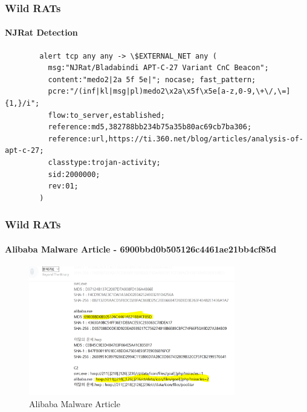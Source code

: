 \documentclass[aspectratio=169]{beamer}
\begin{document}
\begin{frame}[fragile]{}
  \frametitle{Wild RATs}
  \framesubtitle{NJRat Detection}
  \begin{center}
    \begin{tcolorbox}[title=njrat.rules,colback=black]
    \begin{minipage}{0.5\textwidth}
      \begin{verbatim}
        alert tcp any any -> \$EXTERNAL_NET any (
          msg:"NJRat/Bladabindi APT-C-27 Variant CnC Beacon";
          content:"medo2|2a 5f 5e|"; nocase; fast_pattern;
          pcre:"/(inf|kl|msg|pl)medo2\x2a\x5f\x5e[a-z,0-9,\+\/,\=]{1,}/i";
          flow:to_server,established;
          reference:md5,382788bb234b75a35b80ac69cb7ba306;
          reference:url,https://ti.360.net/blog/articles/analysis-of-apt-c-27;
          classtype:trojan-activity;
          sid:2000000;
          rev:01;
        )
      \end{verbatim}
    \end{minipage}
    \end{tcolorbox}
  \end{center}
\end{frame}

\begin{frame}
  \frametitle{Wild RATs}
  \framesubtitle{Alibaba Malware Article - 6900bbd0b505126c4461ae21bb4cf85d}
  \begin{center}
    \begin{figure}
      \includegraphics[width=9cm,keepaspectratio]{alibaba_article_0}
      \caption{Alibaba Malware Article}
    \end{figure}
  \end{center}
\end{frame}
\end{document}
